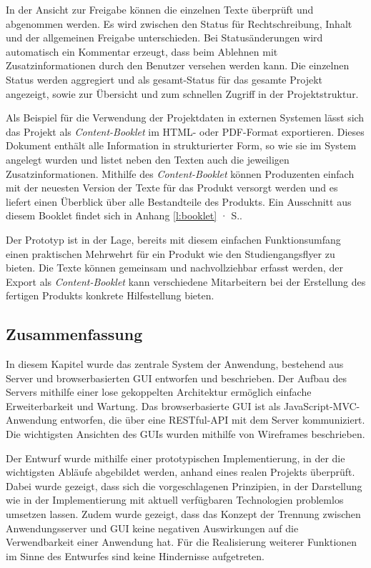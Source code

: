 In der Ansicht zur Freigabe können die einzelnen Texte überprüft und abgenommen werden. Es wird zwischen den Status für Rechtschreibung, Inhalt und der allgemeinen Freigabe unterschieden. Bei Statusänderungen wird automatisch ein Kommentar erzeugt, dass beim Ablehnen mit Zusatzinformationen durch den Benutzer versehen werden kann. Die einzelnen Status werden aggregiert und als gesamt-Status für das gesamte Projekt angezeigt, sowie zur Übersicht und zum schnellen Zugriff in der Projektstruktur.

Als Beispiel für die Verwendung der Projektdaten in externen Systemen lässt sich das Projekt als \emph{Content-Booklet} im HTML- oder PDF-Format exportieren. Dieses Dokument enthält alle Information in strukturierter Form, so wie sie im System angelegt wurden und listet neben den Texten auch die jeweiligen Zusatzinformationen. Mithilfe des \emph{Content-Booklet} können Produzenten einfach mit der neuesten Version der Texte für das Produkt versorgt werden und es liefert einen Überblick über alle Bestandteile des Produkts. Ein Ausschnitt aus diesem Booklet findet sich in Anhang \ref{l:booklet} · S.\pageref{l:booklet}.

\secbar

Der Prototyp ist in der Lage, bereits mit diesem einfachen Funktionsumfang einen praktischen Mehrwehrt für ein Produkt wie den Studiengangsflyer zu bieten. Die Texte können gemeinsam und nachvollziehbar erfasst werden, der Export als \emph{Content-Booklet} kann verschiedene Mitarbeitern bei der Erstellung des fertigen Produkts konkrete Hilfestellung bieten.

\pagebreak

\subsection{Zusammenfassung}

In diesem Kapitel wurde das zentrale System der Anwendung, bestehend aus Server und browserbasierten GUI entworfen und beschrieben. Der Aufbau des Servers mithilfe einer lose gekoppelten Architektur ermöglich einfache Erweiterbarkeit und Wartung. Das browserbasierte GUI ist als JavaScript-MVC-Anwendung entworfen, die über eine RESTful-API mit dem Server kommuniziert. Die wichtigsten Ansichten des GUIs wurden mithilfe von Wireframes beschrieben. 

Der Entwurf wurde mithilfe einer prototypischen Implementierung, in der die wichtigsten Abläufe abgebildet werden, anhand eines realen Projekts überprüft. Dabei wurde gezeigt, dass sich die vorgeschlagenen Prinzipien, in der Darstellung wie in der Implementierung mit aktuell verfügbaren Technologien problemlos umsetzen lassen. Zudem wurde gezeigt, dass das Konzept der Trennung zwischen Anwendungsserver und GUI keine negativen Auswirkungen auf die Verwendbarkeit einer Anwendung hat. Für die Realisierung weiterer Funktionen im Sinne des Entwurfes sind keine Hindernisse aufgetreten.

